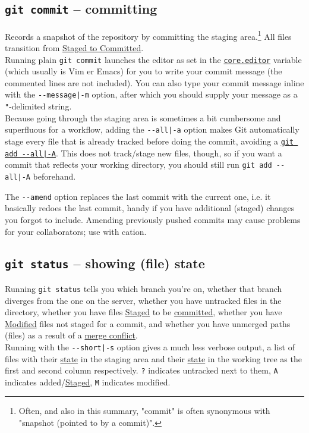 \documentclass[8pt, table, xcdraw]{article}%
\begin{document}
\subsection{\lstinline{git commit} -- committing} \label{commit}

Records a snapshot of the repository by committing the staging area.\footnote{Often, and also in this summary, "commit" is often synonymous with "snapshot (pointed to by a commit)".} All files transition from \hyperref[states]{Staged to Committed}.\\
Running plain \lstinline{git commit} launches the editor as set in the \hyperref[config]{\lstinline{core.editor}} variable (which usually is Vim er Emacs) for you to write your commit message (the commented lines are not included). You can also type your commit message inline with the \lstinline{--message|-m} option, after which you should supply your message as a \lstinline{"}-delimited string.\\
Because going through the staging area is sometimes a bit cumbersome and superfluous for a workflow, adding the \lstinline{--all|-a} option makes Git automatically stage every file that is already tracked before doing the commit, avoiding a \hyperref[add]{\lstinline{git add --all|-A}}. This does not track/stage new files, though, so if you want a commit that reflects your working directory, you should still run \lstinline{git add --all|-A} beforehand.

The \lstinline{--amend} option replaces the last commit with the current one, i.e. it basically redoes the last commit, handy if you have additional (staged) changes you forgot to include. Amending previously pushed commits may cause problems for your collaborators; use with cation.

\subsection{\lstinline{git status} -- showing (file) state} \label{status}

Running \lstinline{git status} tells you which branch you're on, whether that branch diverges from the one on the server, whether you have untracked files in the directory, whether you have files \hyperref[states]{Staged} to be \hyperref[commit]{committed}, whether you have \hyperref[states]{Modified} files not staged for a commit, and whether you have unmerged paths (files) as a result of a \hyperref[merge]{merge conflict}.\\
Running with the \lstinline{--short|-s} option gives a much less verbose output, a list of files with their \hyperref[state]{state} in the staging area and their \hyperref[state]{state} in the working tree as the first and second column respectively. \lstinline{?} indicates untracked next to them, \lstinline{A} indicates added/\hyperref[states]{Staged}, \lstinline{M} indicates modified.
\end{document}
